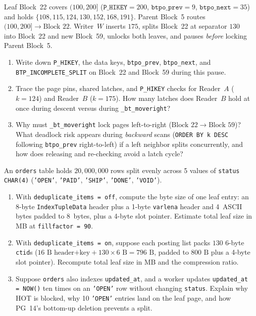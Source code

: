 \begin{exercise}
\label{exer:ch03-lehman-yao-trace}
Leaf Block~22 covers $(100, 200]$ ($\texttt{P\_HIKEY} = 200$, $\texttt{btpo\_prev} = 9$, $\texttt{btpo\_next} = 35$) and holds $\{108, 115, 124, 130, 152, 168, 191\}$. Parent Block~5 routes $(100, 200] \to \text{Block } 22$. Writer~$W$ inserts $175$, splits Block~22 at separator $130$ into Block~22 and new Block~59, unlocks both leaves, and pauses \emph{before} locking Parent Block~5.
\begin{enumerate}
  \item Write down \texttt{P\_HIKEY}, the data keys, \texttt{btpo\_prev}, \texttt{btpo\_next}, and \texttt{BTP\_INCOMPLETE\_SPLIT} on Block~22 and Block~59 during this pause.
  \item Trace the page pins, shared latches, and \texttt{P\_HIKEY} checks for Reader~$A$ ($k = 124$) and Reader~$B$ ($k = 175$). How many latches does Reader~$B$ hold at once during descent versus during \texttt{\_bt\_moveright}?
  \item Why must \texttt{\_bt\_moveright} lock pages left-to-right ($\text{Block } 22 \to \text{Block } 59$)? What deadlock risk appears during \emph{backward} scans (\texttt{ORDER BY k DESC} following \texttt{btpo\_prev} right-to-left) if a left neighbor splits concurrently, and how does releasing and re-checking avoid a latch cycle?
\end{enumerate}
\end{exercise}

\begin{exercise}
\label{exer:ch03-dedup-math}
An \texttt{orders} table holds $20{,}000{,}000$ rows split evenly across 5 values of \texttt{status CHAR(4)} (\texttt{'OPEN'}, \texttt{'PAID'}, \texttt{'SHIP'}, \texttt{'DONE'}, \texttt{'VOID'}).
\begin{enumerate}
  \item With \texttt{deduplicate\_items = off}, compute the byte size of one leaf entry: an 8-byte \texttt{IndexTupleData} header plus a 1-byte \texttt{varlena} header and 4~ASCII bytes padded to 8~bytes, plus a 4-byte slot pointer. Estimate total leaf size in MB at \texttt{fillfactor = 90}.
  \item With \texttt{deduplicate\_items = on}, suppose each posting list packs $130$ 6-byte \texttt{ctid}s ($16\text{ B header+key} + 130 \times 6\text{ B} = 796\text{ B}$, padded to $800\text{ B}$ plus a 4-byte slot pointer). Recompute total leaf size in MB and the compression ratio.
  \item Suppose \texttt{orders} also indexes \texttt{updated\_at}, and a worker updates \texttt{updated\_at = NOW()} ten times on an \texttt{'OPEN'} row without changing \texttt{status}. Explain why HOT is blocked, why 10 \texttt{'OPEN'} entries land on the leaf page, and how PG~14's bottom-up deletion prevents a split.
\end{enumerate}
\end{exercise}


